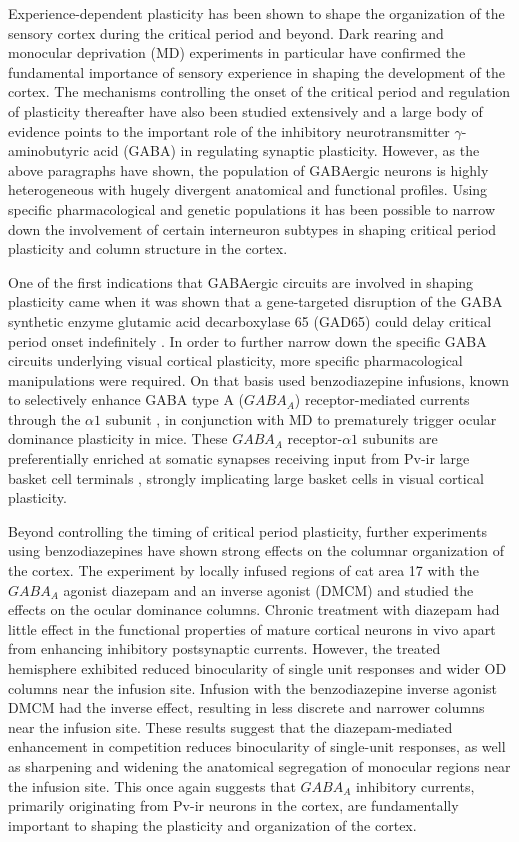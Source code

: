 Experience-dependent plasticity has been shown to shape the
organization of the sensory cortex during the critical period and
beyond. Dark rearing \citep{Fregnac1978} and monocular deprivation
(MD) experiments \citep{Shatz1978} in particular have confirmed the
fundamental importance of sensory experience in shaping the
development of the cortex. The mechanisms controlling the onset of the
critical period and regulation of plasticity thereafter have also been
studied extensively and a large body of evidence points to the
important role of the inhibitory neurotransmitter
$\gamma$-aminobutyric acid (GABA) in regulating synaptic
plasticity. However, as the above paragraphs have shown, the population
of GABAergic neurons is highly heterogeneous with hugely divergent
anatomical and functional profiles. Using specific pharmacological and
genetic populations it has been possible to narrow down the
involvement of certain interneuron subtypes in shaping critical period
plasticity and column structure in the cortex.

One of the first indications that GABAergic circuits are involved in
shaping plasticity came when it was shown that a gene-targeted
disruption of the GABA synthetic enzyme glutamic acid decarboxylase 65
(GAD65) could delay critical period onset indefinitely
\citep{Fagiolini2000}. In order to further narrow down the specific
GABA circuits underlying visual cortical plasticity, more specific
pharmacological manipulations were required. On that basis
\cite{Fagiolini2004} used benzodiazepine infusions, known to
selectively enhance GABA type A ($GABA_A$) receptor-mediated currents
through the $\alpha1$ subunit \citep{Rudolph1999}, in conjunction with
MD to prematurely trigger ocular dominance plasticity in mice. These
$GABA_A$ receptor-$\alpha1$ subunits are preferentially enriched at
somatic synapses receiving input from Pv-ir large basket cell
terminals \citep{Klausberger2002}, strongly implicating large basket
cells in visual cortical plasticity.

Beyond controlling the timing of critical period plasticity, further
experiments using benzodiazepines have shown strong effects on the
columnar organization of the cortex. The experiment by
\cite{Hensch2004} locally infused regions of cat area 17 with the
$GABA_A$ agonist diazepam and an inverse agonist (DMCM) and studied
the effects on the ocular dominance columns. Chronic treatment with
diazepam had little effect in the functional properties of mature
cortical neurons in vivo apart from enhancing inhibitory postsynaptic
currents. However, the treated hemisphere exhibited reduced
binocularity of single unit responses and wider OD columns near the
infusion site. Infusion with the benzodiazepine inverse agonist DMCM
had the inverse effect, resulting in less discrete and narrower
columns near the infusion site. These results suggest that the
diazepam-mediated enhancement in competition reduces binocularity of
single-unit responses, as well as sharpening and widening the
anatomical segregation of monocular regions near the infusion
site. This once again suggests that $GABA_A$ inhibitory currents,
primarily originating from Pv-ir neurons in the cortex, are
fundamentally important to shaping the plasticity and organization of
the cortex.

